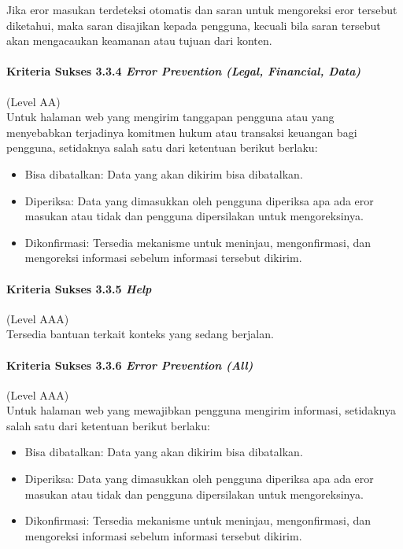 \documentclass[a4paper,twoside]{article}
\begin{document}
\begin{enumerate}
		Jika eror masukan terdeteksi otomatis dan saran untuk mengoreksi eror tersebut diketahui, maka saran disajikan kepada pengguna, kecuali bila saran tersebut akan mengacaukan keamanan atau tujuan dari konten.

		\paragraph{Kriteria Sukses 3.3.4 \textit{Error Prevention (Legal, Financial, Data)\\}}
		\label{sec:kriteria_sukses_3.3.4}
		(Level AA)\\

		Untuk halaman web yang mengirim tanggapan pengguna atau yang menyebabkan terjadinya komitmen hukum atau transaksi keuangan bagi pengguna, setidaknya salah satu dari ketentuan berikut berlaku:
		\begin{itemize}
			\item Bisa dibatalkan: Data yang akan dikirim bisa dibatalkan.
			\item Diperiksa: Data yang dimasukkan oleh pengguna diperiksa apa ada eror masukan atau tidak dan pengguna dipersilakan untuk mengoreksinya.
			\item Dikonfirmasi: Tersedia mekanisme untuk meninjau, mengonfirmasi, dan mengoreksi informasi sebelum informasi tersebut dikirim.
		\end{itemize}

		\paragraph{Kriteria Sukses 3.3.5 \textit{Help}}
		\label{sec:kriteria_sukses_3.3.5}
		(Level AAA)\\

		Tersedia bantuan terkait konteks yang sedang berjalan.

		\paragraph{Kriteria Sukses 3.3.6 \textit{Error Prevention (All)}}
		\label{sec:kriteria_sukses_3.3.6}
		(Level AAA)\\

		Untuk halaman web yang mewajibkan pengguna mengirim informasi, setidaknya salah satu dari ketentuan berikut berlaku:
		\begin{itemize}
			\item Bisa dibatalkan: Data yang akan dikirim bisa dibatalkan.
			\item Diperiksa: Data yang dimasukkan oleh pengguna diperiksa apa ada eror masukan atau tidak dan pengguna dipersilakan untuk mengoreksinya.
			\item Dikonfirmasi: Tersedia mekanisme untuk meninjau, mengonfirmasi, dan mengoreksi informasi sebelum informasi tersebut dikirim.
		\end{itemize}


\end{enumerate}
\end{document}
